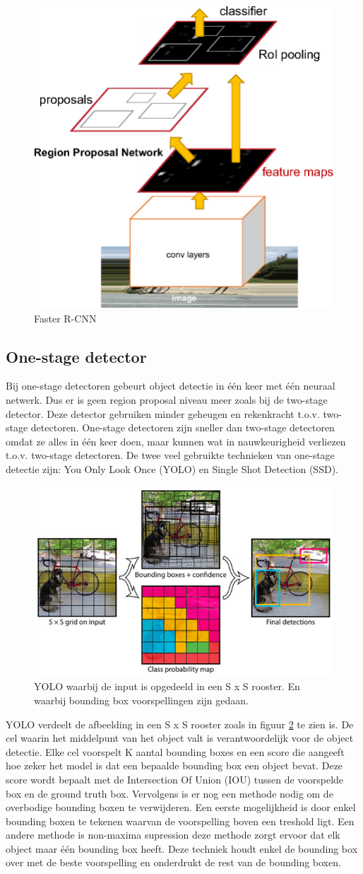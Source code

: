 \begin{figure}[!ht]
    \centering
 	\includegraphics[width=0.3\linewidth]{fig/Faster-R-CNN.png}
 	\caption{Faster R-CNN}
 	\label{fig:faster-r-cnn}
\end{figure}

\subsection{One-stage detector}
Bij one-stage detectoren gebeurt object detectie in \'e\'en keer met \'e\'en neuraal netwerk. 
Dus er is geen region proposal niveau meer zoals bij de two-stage detector. 
Deze detector gebruiken minder geheugen en rekenkracht t.o.v. two-stage detectoren.
One-stage detectoren zijn sneller dan two-stage detectoren omdat ze alles in \'e\'en keer doen, maar kunnen wat in nauwkeurigheid verliezen t.o.v. two-stage detectoren.
De twee veel gebruikte technieken van one-stage detectie zijn: You Only Look Once (YOLO) en Single Shot Detection (SSD).

\begin{figure}[!ht]
	\centering
	\includegraphics[width=0.60\linewidth]{fig/YOLO.jpg}
	\caption{YOLO waarbij de input is opgedeeld in een S x S rooster. 
	En waarbij bounding box voorspellingen zijn gedaan.}
	\label{fig:yolo}
\end{figure}

YOLO \cite{redmon_you_2016} verdeelt de afbeelding in een S x S rooster zoals in figuur \ref{fig:yolo} te zien is. 
De cel waarin het middelpunt van het object valt is verantwoordelijk voor de object detectie.
Elke cel voorspelt K aantal bounding boxes en een score die aangeeft hoe zeker het model is dat een bepaalde bounding box een object bevat.
Deze score wordt bepaalt met de Intersection Of Union (IOU) tussen de voorspelde box en de ground truth box.
Vervolgens is er nog een methode nodig om de overbodige bounding boxen te verwijderen. 
Een eerste mogelijkheid is door enkel bounding boxen te tekenen waarvan de voorspelling boven een treshold ligt. 
Een andere methode is non-maxima supression deze methode zorgt ervoor dat elk object maar \'e\'en bounding box heeft. 
Deze techniek houdt enkel de bounding box over met de beste voorspelling en onderdrukt de rest van de bounding boxen. 

